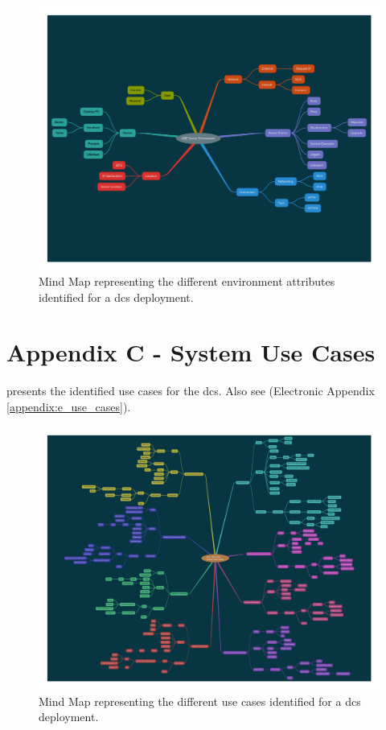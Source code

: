 \begin{appendices}
\begin{figure}[htp]
    \centering
    \label{fig:appendix_environments}
    \includegraphics[width=\linewidth]{appendices/mind_maps/ABE_Environments_slides_Oct26.pdf}
    \caption{Mind Map representing the different environment attributes identified for a \acrshort{dcs} deployment.}
\end{figure}

\clearpage

\section{Appendix C - System Use Cases}
\label{appendix:use_cases}

 presents the identified use cases for the \acrfull{dcs}. Also see (Electronic Appendix \ref{appendix:e_use_cases}).

\begin{figure}[htp]
    \centering
    \label{fig:appendix_use_cases}
    \includegraphics[width=\linewidth]{appendices/mind_maps/ABE_Use_Cases_slides_Oct26.pdf}
    \caption{Mind Map representing the different use cases identified for a \acrshort{dcs} deployment.}
\end{figure}


\end{appendices}
